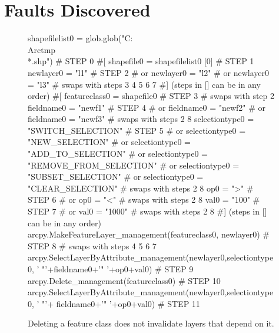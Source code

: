 \section{Faults Discovered}

\begin{figure}
{\scriptsize 
\begin{code}
shapefilelist0 = glob.glob("C:\\Arctmp\\*.shp")                                           \textcolor{black!45}{\# STEP 0}
\textcolor{black!45}{\#[}
shapefile0 = shapefilelist0 [0]                                           \textcolor{black!45}{\# STEP 1}
newlayer0 = "l1"                                                          \textcolor{black!45}{\# STEP 2}
\textcolor{black!45}{\#  or newlayer0 = "l2" }
\textcolor{black!45}{\#  or newlayer0 = "l3" }
\textcolor{black!45}{\#  swaps with steps 3 4 5 6 7}
\textcolor{black!45}{\#] (steps in [] can be in any order)}
\textcolor{black!45}{\#[}
featureclass0 = shapefile0                                                \textcolor{black!45}{\# STEP 3}
\textcolor{black!45}{\#  swaps with step 2}
fieldname0 = "newf1"                                                      \textcolor{black!45}{\# STEP 4}
\textcolor{black!45}{\#  or fieldname0 = "newf2" }
\textcolor{black!45}{\#  or fieldname0 = "newf3" }
\textcolor{black!45}{\#  swaps with steps 2 8}
selectiontype0 = "SWITCH\_SELECTION"                                       \textcolor{black!45}{\# STEP 5}
\textcolor{black!45}{\#  or selectiontype0 = "NEW\_SELECTION" }
\textcolor{black!45}{\#  or selectiontype0 = "ADD\_TO\_SELECTION" }
\textcolor{black!45}{\#  or selectiontype0 = "REMOVE\_FROM\_SELECTION"}
\textcolor{black!45}{\#  or selectiontype0 = "SUBSET\_SELECTION"}
\textcolor{black!45}{\#  or selectiontype0 = "CLEAR\_SELECTION"   }
\textcolor{black!45}{\#  swaps with steps 2 8}
op0 = ">"                                                                 \textcolor{black!45}{\# STEP 6}
\textcolor{black!45}{\#  or op0 = "<" }
\textcolor{black!45}{\#  swaps with steps 2 8}
val0 = "100"                                                              \textcolor{black!45}{\# STEP 7}
\textcolor{black!45}{\#  or val0 = "1000" }
\textcolor{black!45}{\#  swaps with steps 2 8}
\textcolor{black!45}{\#] (steps in [] can be in any order)}
arcpy.MakeFeatureLayer\_management(featureclass0, newlayer0)                                             \textcolor{black!45}{\# STEP 8}
\textcolor{black!45}{\#  swaps with steps 4 5 6 7}
arcpy.SelectLayerByAttribute\_management(newlayer0,selectiontype0,
   ' "'+fieldname0+'" '+op0+val0)                                         \textcolor{black!45}{\# STEP 9}
arcpy.Delete\_management(featureclass0)                                    \textcolor{black!45}{\# STEP 10}
arcpy.SelectLayerByAttribute\_management(newlayer0,selectiontype0,
   ' "'+ fieldname0+'" '+op0+val0)                                        \textcolor{black!45}{\# STEP 11}
\end{code}
}
\caption{Deleting a feature class does not invalidate layers that depend on it.}
\label{fault1}
\end{figure}

